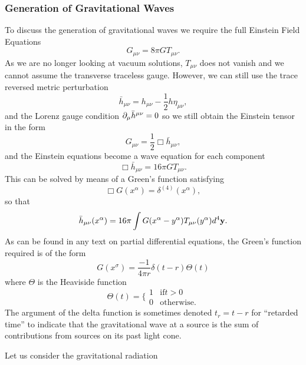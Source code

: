 \subsubsection{Generation of Gravitational Waves}
To discuss the generation of gravitational waves we require the full Einstein Field Equations
\begin{equation}
G_{\mu \nu} = 8 \pi G T_{\mu \nu}.
\end{equation}
As we are no longer looking at vacuum solutions, $T_{\mu \nu}$ does not vanish and we cannot assume the transverse traceless gauge. However, we can still use the trace reversed metric perturbation 
\begin{equation}
\bar{h}_{\mu \nu} = h_{\mu \nu} - \frac{1}{2} h \eta_{\mu \nu},
\end{equation}
and the Lorenz gauge condition ${\partial}_{\mu}\bar{h}^{\mu \nu} = 0$ so we still obtain the Einstein tensor in the form 
\begin{equation}
G_{\mu\nu} = \frac{1}{2} \Box \bar{h}_{\mu \nu},
\end{equation}
and the Einstein equations become a wave equation for each component 
\begin{equation}
\Box \bar{h}_{\mu \nu}=16 \pi G T_{\mu \nu}.
\end{equation}
This can be solved by means of a Green's function satisfying
\begin{equation}\label{eq:Greens}
\Box G(x^{\alpha}) = \delta^{(4)} (x^{\alpha}),
\end{equation}
so that 
\begin{equation}
\bar{h}_{\mu \nu}(x^{\alpha})= 16\pi \int G(x^{\alpha}-y^{\alpha})T_{\mu \nu} (y^{\alpha}) d^4 {\mathbf{y}}.
\end{equation}
As can be found in any text on partial differential equations, the Green's function required is of the form 
\begin{equation}
G(x^{\sigma})= \frac{-1}{4\pi r}\delta(t-r)\Theta(t)
\end{equation}
where $\Theta$ is the Heaviside function
\begin{equation}
\Theta(t)=\lbrace\begin{array}{lc}
1 & \mbox{if} t>0 \\
0 & \mbox{otherwise.}
\end{array}
\end{equation}
The argument of the delta function is sometimes denoted $t_r = t-r$ for ``retarded time'' to indicate that the gravitational wave at a source is the sum of contributions from sources on its past light cone.

Let us consider the gravitational radiation 
%

